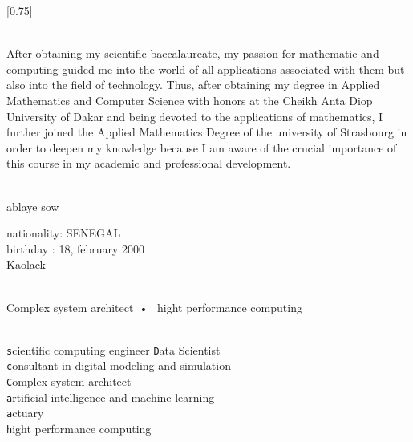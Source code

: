 \documentclass[lighthipster]{simplehipstercv}
\begin{document}
\setlength{\columnsep}{1.5cm}
[0.75]
\begin{paracol}{2}

\paracolbackgroundoptions



\footnotesize
{\setasidefontcolour
\flushright
\begin{center}
\end{center}

\\[0.3em]

{\footnotesize
After obtaining my scientific baccalaureate, my passion for mathematic and computing guided me 
into the world of all applications associated with them but also into the field of technology.
Thus, after obtaining my degree in Applied Mathematics and Computer Science with honors at the 
Cheikh Anta Diop University of Dakar and being devoted to the applications of mathematics, 
I further joined the Applied Mathematics Degree of the university of Strasbourg in order to 
deepen my knowledge because I am aware of the crucial importance of this course in my academic
and professional development.}
\bigskip

 \\[0.5em]
ablaye sow

nationality: SENEGAL\\
birthday : 18, february 2000\\Kaolack

\bigskip

 \\[0.5em]

Complex system architect~•~ hight performance computing 

\bigskip

\\[0.3em]

\texttt scientific computing engineer
\texttt Data Scientist\\
\texttt consultant in digital modeling and simulation\\
\texttt Complex system architect\\
\texttt artificial intelligence and machine learning\\
\texttt actuary\\
\texttt hight performance computing\\

}
\end{paracol}
\end{document}
